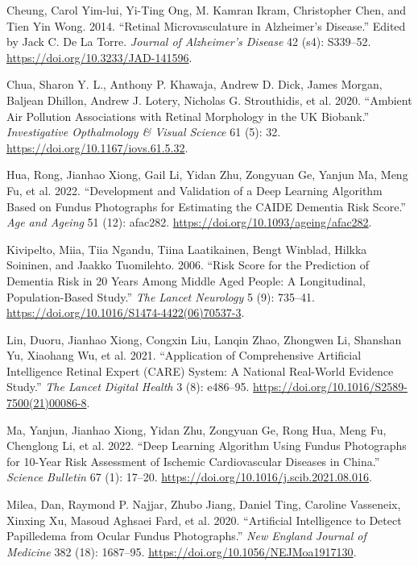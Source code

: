 \documentclass[
  Letterpaper,
]{scrbook}
\newlength{\cslhangindent}
\newenvironment{CSLReferences}[2] %
 {\begin{list}{}{%
  \setlength{\itemindent}{0pt}
  \setlength{\leftmargin}{0pt}
  \setlength{\parsep}{0pt}
  \ifodd #1
   \setlength{\leftmargin}{\cslhangindent}
   \setlength{\itemindent}{-1\cslhangindent}
  \fi
  \setlength{\itemsep}{#2\baselineskip}}}
 {\end{list}}
\begin{document}
\label{refs}
\begin{CSLReferences}{1}{0}
Cheung, Carol Yim-lui, Yi-Ting Ong, M. Kamran Ikram, Christopher Chen,
and Tien Yin Wong. 2014. {``Retinal {Microvasculature} in {Alzheimer}'s
{Disease}.''} Edited by Jack C. De La Torre. \emph{Journal of
Alzheimer's Disease} 42 (s4): S339--52.
\url{https://doi.org/10.3233/JAD-141596}.

Chua, Sharon Y. L., Anthony P. Khawaja, Andrew D. Dick, James Morgan,
Baljean Dhillon, Andrew J. Lotery, Nicholas G. Strouthidis, et al. 2020.
{``Ambient {Air} {Pollution} {Associations} with {Retinal} {Morphology}
in the {UK} {Biobank}.''} \emph{Investigative Opthalmology \& Visual
Science} 61 (5): 32. \url{https://doi.org/10.1167/iovs.61.5.32}.

Hua, Rong, Jianhao Xiong, Gail Li, Yidan Zhu, Zongyuan Ge, Yanjun Ma,
Meng Fu, et al. 2022. {``Development and Validation of a Deep Learning
Algorithm Based on Fundus Photographs for Estimating the {CAIDE}
Dementia Risk Score.''} \emph{Age and Ageing} 51 (12): afac282.
\url{https://doi.org/10.1093/ageing/afac282}.

Kivipelto, Miia, Tiia Ngandu, Tiina Laatikainen, Bengt Winblad, Hilkka
Soininen, and Jaakko Tuomilehto. 2006. {``Risk Score for the Prediction
of Dementia Risk in 20 Years Among Middle Aged People: A Longitudinal,
Population-Based Study.''} \emph{The Lancet Neurology} 5 (9): 735--41.
\url{https://doi.org/10.1016/S1474-4422(06)70537-3}.

Lin, Duoru, Jianhao Xiong, Congxin Liu, Lanqin Zhao, Zhongwen Li,
Shanshan Yu, Xiaohang Wu, et al. 2021. {``Application of {Comprehensive}
{Artificial} Intelligence {Retinal} {Expert} ({CARE}) System: A National
Real-World Evidence Study.''} \emph{The Lancet Digital Health} 3 (8):
e486--95. \url{https://doi.org/10.1016/S2589-7500(21)00086-8}.

Ma, Yanjun, Jianhao Xiong, Yidan Zhu, Zongyuan Ge, Rong Hua, Meng Fu,
Chenglong Li, et al. 2022. {``Deep Learning Algorithm Using Fundus
Photographs for 10-Year Risk Assessment of Ischemic Cardiovascular
Diseases in {China}.''} \emph{Science Bulletin} 67 (1): 17--20.
\url{https://doi.org/10.1016/j.scib.2021.08.016}.

Milea, Dan, Raymond P. Najjar, Zhubo Jiang, Daniel Ting, Caroline
Vasseneix, Xinxing Xu, Masoud Aghsaei Fard, et al. 2020. {``Artificial
{Intelligence} to {Detect} {Papilledema} from {Ocular} {Fundus}
{Photographs}.''} \emph{New England Journal of Medicine} 382 (18):
1687--95. \url{https://doi.org/10.1056/NEJMoa1917130}.


\end{CSLReferences}
\end{document}
